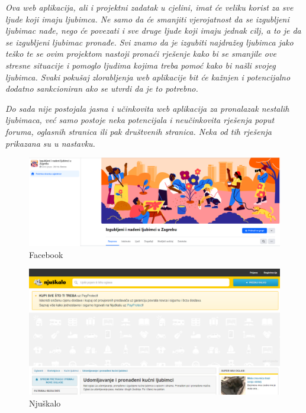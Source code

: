 		\textit{Ova web aplikacija, ali i projektni zadatak u cjelini, imat će veliku korist za sve ljude koji imaju ljubimca. Ne samo da će smanjiti vjerojatnost da se izgubljeni ljubimac nađe, nego će povezati i sve druge ljude koji imaju jednak cilj, a to je da se izgubljeni ljubimac pronađe. Svi znamo da je izgubiti najdražeg ljubimca jako teško te se ovim projektom nastoji pronaći rješenje kako bi se smanjile ove stresne situacije i pomoglo ljudima kojima treba pomoć kako bi našli svojeg ljubimca. Svaki pokušaj zlorabljenja web aplikacije bit će kažnjen i potencijalno dodatno sankcioniran ako se utvrdi da je to potrebno.}
		
		\textit{Do sada nije postojala jasna i učinkovita web aplikacija za pronalazak nestalih ljubimaca, već samo postoje neka potencijala i neučinkovita rješenja poput foruma, oglasnih stranica ili pak društvenih stranica. Neka od tih rješenja prikazana su u nastavku.}
	
		\begin{figure}[H]
			\centering
			\includegraphics[scale=0.3]{slike/Facebook-nestaliLjubimci.PNG}
			\caption{Facebook}
			\label{fig:promjene}
		\end{figure}
	
		\begin{figure}[H]
			\centering
			\includegraphics[scale=0.3]{slike/Njuskalo-nestaliLjubimci.PNG}
			\caption{Njuškalo}
			\label{fig:promjene}
		\end{figure}
		
